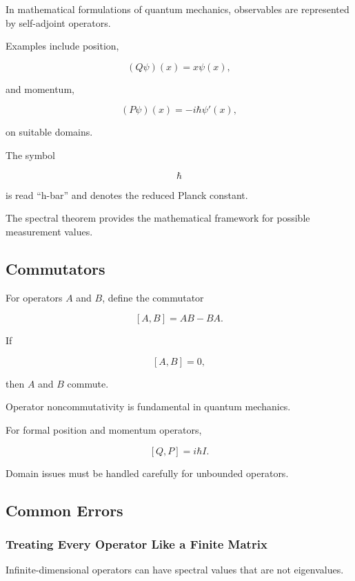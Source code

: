 In mathematical formulations of quantum mechanics, observables are
represented by self-adjoint operators.

Examples include position,

\[
\boxed{
(Q\psi)(x)=x\psi(x),
}
\]

and momentum,

\[
\boxed{
(P\psi)(x)
=
-i\hbar\psi'(x),
}
\]

on suitable domains.

The symbol

\[
\hbar
\]

is read ``h-bar'' and denotes the reduced Planck constant.

The spectral theorem provides the mathematical framework for possible
measurement values.

\subsection{Commutators}
\label{subsec:operator-commutators}

For operators \(A\) and \(B\), define the commutator

\[
\boxed{
[A,B]
=
AB-BA.
}
\]

If

\[
[A,B]=0,
\]

then \(A\) and \(B\) commute.

Operator noncommutativity is fundamental in quantum mechanics.

For formal position and momentum operators,

\[
\boxed{
[Q,P]
=
i\hbar I.
}
\]

Domain issues must be handled carefully for unbounded operators.

\subsection{Common Errors}
\label{subsec:operator-theory-common-errors}

\subsubsection{Treating Every Operator Like a Finite Matrix}

Infinite-dimensional operators can have spectral values that are not
eigenvalues.

